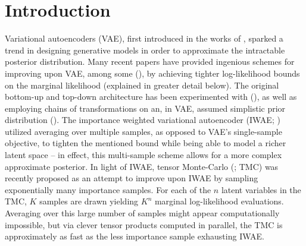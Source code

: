 









\section{Introduction}
Variational autoencoders (VAE), first introduced in the works of \cite{kingma2013autoencoding}, sparked a trend in designing generative models in order to approximate the intractable posterior distribution. Many recent papers have provided ingenious schemes for improving upon VAE, among some (\cite{iwae, rezende2015variational, ladder, kingma2018glow}), by achieving tighter log-likelihood bounds on the marginal likelihood (explained in greater detail below). The original bottom-up and top-down architecture has been experimented with (\cite{ladder}), as well as employing chains of transformations on an, in VAE, assumed simplistic prior distribution (\cite{rezende2015variational, kingma2018glow}). The importance weighted variational autoencoder (IWAE; \cite{iwae}) utilized averaging over multiple samples, as opposed to VAE's single-sample objective, to tighten the mentioned bound while being able to model a richer latent space – in effect, this multi-sample scheme allows for a more complex approximate posterior. In light of IWAE, tensor Monte-Carlo (\cite{tmc}; TMC) was recently proposed as an attempt to improve upon IWAE by sampling exponentially many importance samples. For each of the $n$ latent variables in the TMC, $K$ samples are drawn yielding $K^n$ marginal log-likelihood evaluations. Averaging over this large number of samples might appear computationally impossible, but via clever tensor products computed in parallel, the TMC is approximately as fast as the less importance sample exhausting IWAE. 

